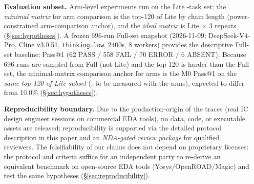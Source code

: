 \textbf{Evaluation subset.} Arm-level experiments run on the Lite \LiteSet{}-task set; the \emph{minimal matrix} for arm comparison is the top-120 of Lite by chain length (power-constrained arm-comparison anchor), and the \emph{ideal matrix} is Lite $\times$ 3 repeats (\S\ref{sec:hypotheses}). A frozen 696-run Full-set snapshot (2026-11-09; DeepSeek-V4-Pro, Cline v3.0.51, \texttt{thinking=low}, 2400s, 8 workers) provides the descriptive Full-set baseline: \MzeroPass{} Pass@1 (62 PASS / 558 FAIL / 70 ERROR / 6 ABSENT). Because 696 runs are sampled from Full (not Lite) and the top-120 is harder than the Full set, the minimal-matrix comparison anchor for arms is the M0 Pass@1 on the \emph{same top-120-of-Lite subset} (\TBD, to be measured with the arms), expected to differ from 10.0\% (\S\ref{sec:hypotheses}).

\textbf{Reproducibility boundary.} Due to the production-origin of the traces (real IC design engineer sessions on commercial EDA tools), no data, code, or executable assets are released; reproducibility is supported via the detailed protocol description in this paper and an \emph{NDA-gated review package} for qualified reviewers. The falsifiability of our claims does not depend on proprietary licenses: the protocol and criteria suffice for an independent party to re-derive an equivalent benchmark on open-source EDA tools (Yosys/OpenROAD/Magic) and test the same hypotheses (\S\ref{sec:reproducibility}).
